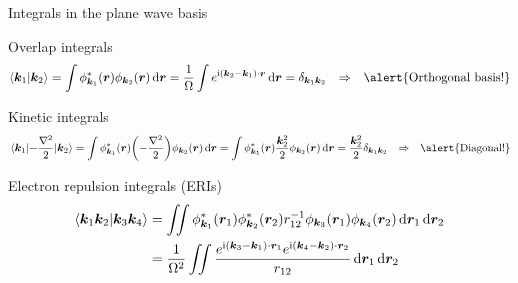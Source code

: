 \documentclass[aspectratio=169,9pt]{beamer}
\newcommand{\bk}{\boldsymbol{k}}
\newcommand{\br}{\boldsymbol{r}}
\newcommand{\ii}{\mathrm{i}}
\begin{document}
\begin{frame}{Integrals in the plane wave basis}
	\begin{block}{Overlap integrals}
		\begin{equation*}
			\braket{\bk_1}{\bk_2} 
			= \int \phi_{\bk_1}^*(\br) \phi_{\bk_2}(\br) \dd{\br} 
			= \frac{1}{\Omega} \int e^{\ii \qty( \bk_2 - \bk_1 ) \cdot \br} \dd{\br} 
			= \delta_{\bk_1 \bk_2}
			\qq{$\Rightarrow$}
			\alert{\text{Orthogonal basis!}}
		\end{equation*}
	\end{block}
	\begin{block}{Kinetic integrals}
		\begin{equation*}
			\mel{\bk_1}{-\frac{\laplacian}{2}}{\bk_2} 
			= \int \phi_{\bk_1}^*(\br) \qty( - \frac{\laplacian}{2}  ) \phi_{\bk_2}(\br) \dd{\br} 
			= \int \phi_{\bk_1}^*(\br) \frac{\bk_2^2}{2} \phi_{\bk_2}(\br) \dd{\br} 
			= \frac{\bk_2^2}{2} \delta_{\bk_1 \bk_2}
			\qq{$\Rightarrow$}
			\alert{\text{Diagonal!}}
		\end{equation*}
	\end{block}
	\begin{block}{Electron repulsion integrals (ERIs)}
		\begin{equation*}
		\begin{split}
			\braket{\bk_1 \bk_2 }{\bk_3 \bk_4} 
			& = \iint \phi_{\bk_1}^*(\br_1) \phi_{\bk_2}^*(\br_2) r_{12}^{-1} \phi_{\bk_3}(\br_1) \phi_{\bk_4}(\br_2) \dd{\br_1} \dd{\br_2} 
			\\
			& = \frac{1}{\Omega^2} \iint \frac{e^{\ii \qty( \bk_3 - \bk_1 ) \cdot \br_1} e^{\ii \qty( \bk_4 - \bk_2 ) \cdot \br_2}}{r_{12}} \dd{\br_1} \dd{\br_2} 
		\end{split}
		\end{equation*}
	\end{block}
\end{frame}
\end{document}
